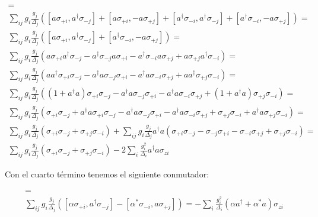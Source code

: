 \begin{multline}
[\sum\limits_i g_i (a \sigma_{+i} + a^\dagger \sigma_{-i}), \sum\limits_j \frac{g_j} {\Delta_j} (a^\dagger \sigma_{-j} - a \sigma_{+j})] = \\
\sum\limits_{ij} g_i \frac{g_j}{\Delta_j} \left([ a \sigma_{+i}, a^\dagger \sigma_{-j}] +
[a \sigma_{+i}, - a \sigma_{+j}] +
[a^\dagger \sigma_{-i}, a^\dagger \sigma_{-j}] +
[a^\dagger \sigma_{-i}, - a \sigma_{+j}]\right) =\\
\sum\limits_{ij} g_i \frac{g_j}{\Delta_j} \left([ a \sigma_{+i}, a^\dagger \sigma_{-j}] +
[a^\dagger \sigma_{-i}, - a \sigma_{+j}]\right) =\\
\sum\limits_{ij} g_i \frac{g_j}{\Delta_j} \left(
    a \sigma_{+i} a^\dagger \sigma_{-j} - a^\dagger \sigma_{-j} a \sigma_{+i}
    - a^\dagger \sigma_{-i} a \sigma_{+j} + a \sigma_{+j} a^\dagger \sigma_{-i}\right) =\\
\sum\limits_{ij} g_i \frac{g_j}{\Delta_j} \left(
    a a^\dagger \sigma_{+i} \sigma_{-j} - a^\dagger a \sigma_{-j} \sigma_{+i}
    - a^\dagger a \sigma_{-i} \sigma_{+j} + a a^\dagger \sigma_{+j} \sigma_{-i}\right) =\\
\sum\limits_{ij} g_i \frac{g_j}{\Delta_j} \left(
    (1 + a^\dagger a) \sigma_{+i} \sigma_{-j} - a^\dagger a \sigma_{-j} \sigma_{+i}
    - a^\dagger a \sigma_{-i} \sigma_{+j} + (1 + a^\dagger a) \sigma_{+j} \sigma_{-i}\right) =\\
\sum\limits_{ij} g_i \frac{g_j}{\Delta_j} \left(
    \sigma_{+i} \sigma_{-j} + a^\dagger a \sigma_{+i} \sigma_{-j} - a^\dagger a \sigma_{-j} \sigma_{+i}
    - a^\dagger a \sigma_{-i} \sigma_{+j} + \sigma_{+j} \sigma_{-i} + a^\dagger a \sigma_{+j} \sigma_{-i}\right) =\\
\sum\limits_{ij} g_i \frac{g_j}{\Delta_j} \left(\sigma_{+i} \sigma_{-j} + \sigma_{+j} \sigma_{-i}\right) +
\sum\limits_{ij} g_i \frac{g_j}{\Delta_j} a^\dagger a \left(
    \sigma_{+i} \sigma_{-j} - \sigma_{-j} \sigma_{+i}
    - \sigma_{-i} \sigma_{+j} + \sigma_{+j} \sigma_{-i}\right) =\\
\sum\limits_{ij} g_i \frac{g_j}{\Delta_j} \left(\sigma_{+i} \sigma_{-j} + \sigma_{+j} \sigma_{-i}\right) -
2 \sum\limits_{i} \frac{g_i^2}{\Delta_i} a^\dagger a \sigma_{zi}
\end{multline}

Con el cuarto término tenemos el siguiente conmutador:

\begin{multline}
[\sum\limits_i g_i (\alpha \sigma_{+i} + \alpha^* \sigma_{-i}), \sum\limits_i \frac{g_i} {\Delta_i} (a^\dagger \sigma_{-i} - a \sigma_{+i})] =\\
\sum\limits_{ij} g_i \frac{g_j} {\Delta_j} \left([\alpha \sigma_{+i}, a^\dagger \sigma_{-j}] - [\alpha^* \sigma_{-i}, a \sigma_{+j}]\right) =
- \sum\limits_i \frac{g_i^2} {\Delta_i} (\alpha a^\dagger + \alpha^* a) \sigma_{zi}
\end{multline}

